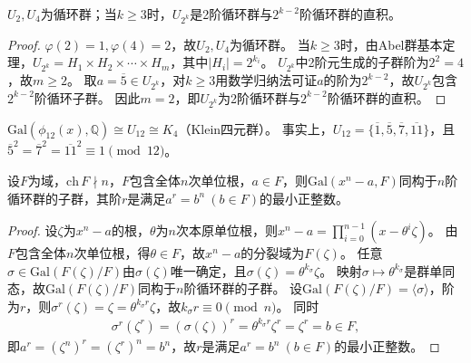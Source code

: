 \documentclass[../../main.tex]{subfiles}%
\begin{document}
\begin{theorem}
$U_2,U_4$为循环群；当$k\geqslant3$时，$U_{2^k}$是2阶循环群与$2^{k-2}$阶循环群的直积。
\end{theorem}
\begin{proof}

$\varphi(2)=1,\varphi(4)=2$，故$U_2,U_4$为循环群。
当$k\geqslant3$时，由Abel群基本定理，$U_{2^k}=H_1\times H_2\times\cdots\times H_m$，其中$|H_i|=2^{k_i}$。
$U_{2^k}$中2阶元生成的子群阶为$2^2=4$，故$m\geqslant2$。
取$a=\overline{5}\in U_{2^k}$，对$k\geqslant3$用数学归纳法可证$a$的阶为$2^{k-2}$，故$U_{2^k}$包含$2^{k-2}$阶循环子群。
因此$m=2$，即$U_{2^k}$为2阶循环群与$2^{k-2}$阶循环群的直积。

\end{proof}

\begin{example}
$\mathrm{Gal}(\phi_{12}(x),\mathbb{Q})\cong U_{12}\cong K_4$（Klein四元群）。
事实上，$U_{12}=\{\overline{1},\overline{5},\overline{7},\overline{11}\}$，且$\overline{5}^2=\overline{7}^2=\overline{11}^2\equiv1\pmod{12}$。
\end{example}

\begin{theorem}
设$F$为域，$\mathrm{ch}\,F\nmid n$，$F$包含全体$n$次单位根，$a\in F$，则$\mathrm{Gal}(x^n-a,F)$同构于$n$阶循环群的子群，其阶$r$是满足$a^r=b^n\ (b\in F)$的最小正整数。
\end{theorem}
\begin{proof}

设$\zeta$为$x^n-a$的根，$\theta$为$n$次本原单位根，则$x^n-a=\prod\limits_{i=0}^{n-1}(x-\theta^i\zeta)$。
由$F$包含全体$n$次单位根，得$\theta\in F$，故$x^n-a$的分裂域为$F(\zeta)$。
任意$\sigma\in\mathrm{Gal}(F(\zeta)/F)$由$\sigma(\zeta)$唯一确定，且$\sigma(\zeta)=\theta^{k_\sigma}\zeta$。
映射$\sigma\mapsto\theta^{k_\sigma}$是群单同态，故$\mathrm{Gal}(F(\zeta)/F)$同构于$n$阶循环群的子群。
设$\mathrm{Gal}(F(\zeta)/F)=\langle\sigma\rangle$，阶为$r$，则$\sigma^r(\zeta)=\zeta=\theta^{k_\sigma r}\zeta$，故$k_\sigma r\equiv0\pmod{n}$。
同时
\begin{align*}
\sigma^r(\zeta^r)=(\sigma(\zeta))^r=\theta^{k_\sigma r}\zeta^r=\zeta^r=b\in F,
\end{align*}
即$a^r=(\zeta^n)^r=(\zeta^r)^n=b^n$，故$r$是满足$a^r=b^n\ (b\in F)$的最小正整数。

\end{proof}
\end{document}
